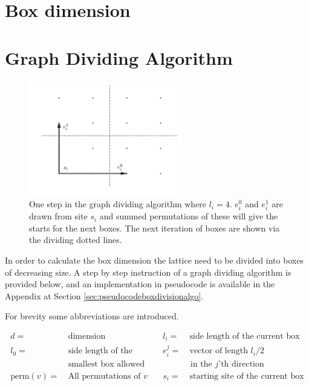 \section{Box dimension}
\label{sec:boxdimension}

\section{Graph Dividing Algorithm}
\label{sec:GraphDivisonAlgorithm}


\begin{figure}[h!]
    \centering
        \includegraphics[width=0.6\textwidth]{figures/graphDividing.png}
    \caption{One step in the graph dividing algorithm where $l_i = 4$. $e^0_i$ and $e^1_i$ are drawn from site $s_i$ and summed permutations of these will give the starts for the next boxes. The next iteration of boxes are shown via the dividing dotted lines.}
    \label{fig:graphdividingalgo}
\end{figure}

In order to calculate the box dimension the lattice need to be divided into boxes of decreasing size. A step by step instruction of a graph dividing algorithm is provided below, and an implementation in pseudocode is available in the Appendix at Section \ref{sec:pseudocodeboxdivisionalgo}.

For brevity some abbreviations are introduced.

\begin{equation*}
    \begin{aligned}
        d =& \ \text{dimension} &\quad l_i =& \ \text{side length of the current box}\\
%
        l_0 =& \ \text{side length of the} &\quad e_i^j =& \ \text{vector of length } l_i / 2 \\
%
             & \ \text{smallest box allowed} & & \text{ in the }j\text{'th direction} \\
%
        \text{perm}(v) =& \ \text{All permutations of } v &\quad s_i =& \ \text{starting site of the current box}
    \end{aligned}
\end{equation*}


